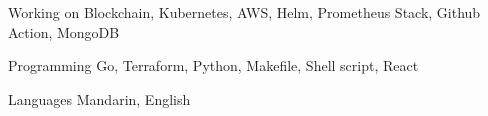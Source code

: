 

\begin{cvskills}

  \cvskill
    {Working on} %
    {Blockchain, Kubernetes, AWS, Helm, Prometheus Stack, Github Action, MongoDB} %

  \cvskill
    {Programming} %
    {Go, Terraform, Python, Makefile, Shell script, React} %

  \cvskill
    {Languages} %
    {Mandarin, English} %

\end{cvskills}
